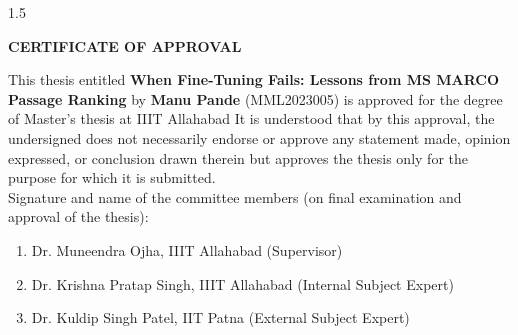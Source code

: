 \begin{spacing}{1.5}
\begin{center}
    {\centering\large\bfseries CERTIFICATE OF APPROVAL \par\vspace{10pt}}
\end{center}

 This thesis entitled \textbf{When Fine-Tuning Fails: Lessons from MS MARCO Passage Ranking}  by \textbf{Manu Pande} (MML2023005) is approved for the degree of Master's thesis at IIIT Allahabad  It is understood that by this approval, the undersigned does not necessarily endorse or approve any statement made, opinion expressed, or conclusion drawn
therein but approves the thesis only for the purpose for which it is submitted.\\[40 pt]

 Signature and name of the committee members (on final examination and approval of the thesis): \\[10 pt]
 \begin{flushleft}
     \begin{enumerate}
         \item Dr. Muneendra Ojha, IIIT Allahabad (Supervisor) \\[25pt]
         \item Dr. Krishna Pratap Singh, IIIT Allahabad (Internal Subject Expert) \\[25 pt]
         \item Dr. Kuldip Singh Patel, IIT Patna (External Subject Expert) \\[25 pt]
     \end{enumerate}
 \end{flushleft}
 \vspace{20 pt}
 \begin{flushright}
     \begin{minipage}{0.5\textwidth}
        \flushright \vspace{60 pt}
        \underline{\hspace{6cm}} \\
         \\[80pt]
    \end{minipage}
 \end{flushright}
\end{spacing} 

\newpage
{}

\newpage

